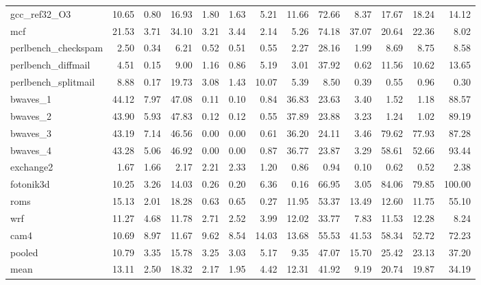 \documentclass[10pt,a4paper]{article}
\begin{document}
{\begin{longtable}{@{}lrrrrrrrrrrrr@{}}
gcc\_ref32\_O3 & 10.65 & 0.80 & 16.93 & 1.80 & 1.63 & 5.21 & 11.66 & 72.66 & 8.37 & 17.67 & 18.24 & 14.12 \\
mcf & 21.53 & 3.71 & 34.10 & 3.21 & 3.44 & 2.14 & 5.26 & 74.18 & 37.07 & 20.64 & 22.36 & 8.02 \\
perlbench\_checkspam & 2.50 & 0.34 & 6.21 & 0.52 & 0.51 & 0.55 & 2.27 & 28.16 & 1.99 & 8.69 & 8.75 & 8.58 \\
perlbench\_diffmail & 4.51 & 0.15 & 9.00 & 1.16 & 0.86 & 5.19 & 3.01 & 37.92 & 0.62 & 11.56 & 10.62 & 13.65 \\
perlbench\_splitmail & 8.88 & 0.17 & 19.73 & 3.08 & 1.43 & 10.07 & 5.39 & 8.50 & 0.39 & 0.55 & 0.96 & 0.30 \\
bwaves\_1 & 44.12 & 7.97 & 47.08 & 0.11 & 0.10 & 0.84 & 36.83 & 23.63 & 3.40 & 1.52 & 1.18 & 88.57 \\
bwaves\_2 & 43.90 & 5.93 & 47.83 & 0.12 & 0.12 & 0.55 & 37.89 & 23.88 & 3.23 & 1.24 & 1.02 & 89.19 \\
bwaves\_3 & 43.19 & 7.14 & 46.56 & 0.00 & 0.00 & 0.61 & 36.20 & 24.11 & 3.46 & 79.62 & 77.93 & 87.28 \\
bwaves\_4 & 43.28 & 5.06 & 46.92 & 0.00 & 0.00 & 0.87 & 36.77 & 23.87 & 3.29 & 58.61 & 52.66 & 93.44 \\
exchange2 & 1.67 & 1.66 & 2.17 & 2.21 & 2.33 & 1.20 & 0.86 & 0.94 & 0.10 & 0.62 & 0.52 & 2.38 \\
fotonik3d & 10.25 & 3.26 & 14.03 & 0.26 & 0.20 & 6.36 & 0.16 & 66.95 & 3.05 & 84.06 & 79.85 & 100.00 \\
roms & 15.13 & 2.01 & 18.28 & 0.63 & 0.65 & 0.27 & 11.95 & 53.37 & 13.49 & 12.60 & 11.75 & 55.10 \\
wrf & 11.27 & 4.68 & 11.78 & 2.71 & 2.52 & 3.99 & 12.02 & 33.77 & 7.83 & 11.53 & 12.28 & 8.24 \\
cam4 & 10.69 & 8.97 & 11.67 & 9.62 & 8.54 & 14.03 & 13.68 & 55.53 & 41.53 & 58.34 & 52.72 & 72.23 \\
\midrule
pooled & 10.79 & 3.35 & 15.78 & 3.25 & 3.03 & 5.17 & 9.35 & 47.07 & 15.70 & 25.42 & 23.13 & 37.20 \\
mean & 13.11 & 2.50 & 18.32 & 2.17 & 1.95 & 4.42 & 12.31 & 41.92 & 9.19 & 20.74 & 19.87 & 34.19 \\
\end{longtable}
}
\end{document}
